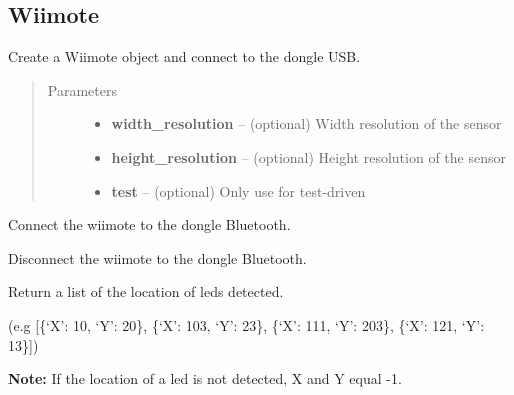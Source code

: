 \documentclass[letterpaper,10pt,english]{sphinxmanual}
\begin{document}
\subsection{Wiimote}
\label{api:wiimote}

\begin{fulllineitems}
\label{api:wiimote.Wiimote}
Create a Wiimote object and
connect to the dongle USB.
\begin{quote}\begin{description}
\item[{Parameters}] \leavevmode\begin{itemize}
\item {} 
\textbf{width\_resolution} -- (optional) Width resolution of the sensor

\item {} 
\textbf{height\_resolution} -- (optional) Height resolution of the sensor

\item {} 
\textbf{test} -- (optional) Only use for test-driven

\end{itemize}

\end{description}\end{quote}

\begin{fulllineitems}
\label{api:wiimote.Wiimote.connect}
Connect the wiimote to the dongle Bluetooth.

\end{fulllineitems}


\begin{fulllineitems}
\label{api:wiimote.Wiimote.disconnect}
Disconnect the wiimote to the dongle Bluetooth.

\end{fulllineitems}


\begin{fulllineitems}
\label{api:wiimote.Wiimote.get_leds}
Return a list of the location of leds detected.

(e.g {[}\{`X': 10, `Y': 20\}, \{`X': 103, `Y': 23\}, \{`X': 111, `Y': 203\}, \{`X': 121, `Y': 13\}{]})

\textbf{Note:} If the location of a led is not detected, X and Y equal -1.

\end{fulllineitems}


\end{fulllineitems}
\end{document}
